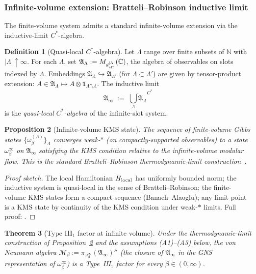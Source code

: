 \documentclass[11pt]{article}
\theoremstyle{plain}
\newtheorem{theorem}{Theorem}[section]
\newtheorem{proposition}[theorem]{Proposition}
\theoremstyle{definition}
\newtheorem{definition}[theorem]{Definition}
\theoremstyle{remark}
\begin{document}
\bigskip

\subsubsection{Infinite-volume extension: Bratteli--Robinson inductive limit}\label{supp:H52}

The finite-volume system admits a standard infinite-volume extension via the inductive-limit $C^*$-algebra.

\begin{definition}[Quasi-local $C^*$-algebra]\label{def:quasilocal}
Let $\Lambda$ range over finite subsets of $\mathbb{N}$ with $|\Lambda| \uparrow \infty$.  For each $\Lambda$, set $\mathfrak{A}_\Lambda := M_{d_{\rm eff}^{|\Lambda|}}(\mathbb{C})$, the algebra of observables on slots indexed by $\Lambda$.  Embeddings $\mathfrak{A}_\Lambda \hookrightarrow \mathfrak{A}_{\Lambda'}$ (for $\Lambda \subset \Lambda'$) are given by tensor-product extension: $A \in \mathfrak{A}_\Lambda \mapsto A \otimes \mathbf{1}_{\Lambda' \setminus \Lambda}$.  The inductive limit
\[
  \mathfrak{A}_\infty \;:=\; \overline{\bigcup_\Lambda \mathfrak{A}_\Lambda}^{C^*}
\]
is the \emph{quasi-local $C^*$-algebra} of the infinite-slot system.
\end{definition}

\begin{proposition}[Infinite-volume KMS state]\label{prop:iv_kms}
The sequence of finite-volume Gibbs states $\{\omega_\beta^{(\Lambda)}\}_\Lambda$ converges weak-$\ast$ (on compactly-supported observables) to a state $\omega_\beta^\infty$ on $\mathfrak{A}_\infty$ satisfying the KMS condition relative to the infinite-volume modular flow.  This is the standard Bratteli--Robinson thermodynamic-limit construction~\cite[\S5.3]{BratelliRobinson}.
\end{proposition}

\begin{proof}[Proof sketch]
The local Hamiltonian $H_{\rm local}$ has uniformly bounded norm; the inductive system is quasi-local in the sense of Bratteli--Robinson; the finite-volume KMS states form a compact sequence (Banach--Alaoglu); any limit point is a KMS state by continuity of the KMS condition under weak-$\ast$ limits.  Full proof: \cite[Theorem 5.3.30]{BratelliRobinson}.
\end{proof}

\begin{theorem}[Type III$_1$ factor at infinite volume]\label{thm:type_III1}
Under the thermodynamic-limit construction of Proposition~\ref{prop:iv_kms} and the assumptions (A1)--(A3) below, the von Neumann algebra $\mathcal{M}_\beta := \pi_{\omega_\beta^\infty}(\mathfrak{A}_\infty)''$ (the closure of $\mathfrak{A}_\infty$ in the GNS representation of $\omega_\beta^\infty$) is a Type~III$_1$ factor for every $\beta \in (0, \infty)$.
\end{theorem}
\end{document}
